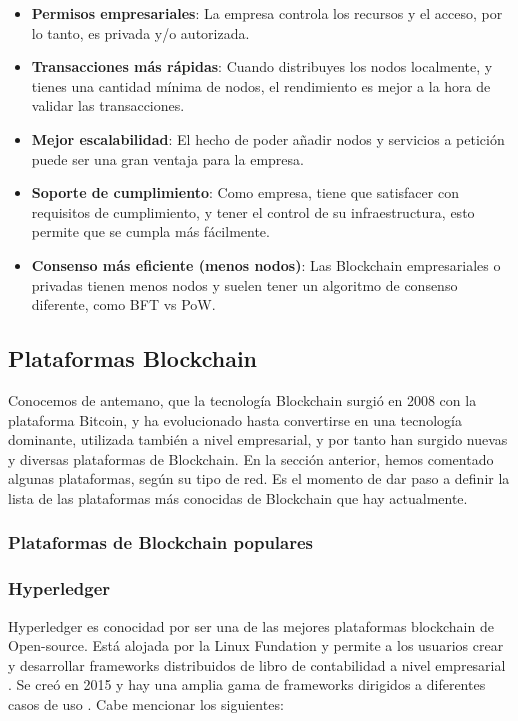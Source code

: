 \begin{itemize}
\item \textbf{Permisos empresariales}: La empresa controla los recursos y el acceso, por lo tanto, es privada y/o 
autorizada.

\item \textbf{Transacciones más rápidas}: Cuando distribuyes los nodos localmente, y tienes una cantidad mínima de 
nodos, el rendimiento es mejor a la hora de validar las transacciones.

\item \textbf{Mejor escalabilidad}: El hecho de poder añadir nodos y servicios a petición puede ser una gran ventaja 
para la empresa.

\item \textbf{Soporte de cumplimiento}: Como empresa, tiene que satisfacer con requisitos de cumplimiento, y tener el 
control de su infraestructura, esto permite que se cumpla más fácilmente.

\item \textbf{Consenso más eficiente (menos nodos)}: Las Blockchain empresariales o privadas tienen menos nodos y 
suelen tener un algoritmo de consenso diferente, como BFT vs PoW.
\end{itemize}

\subsection{Plataformas Blockchain}

Conocemos de antemano, que la tecnología Blockchain surgió en 2008 con la plataforma Bitcoin, y ha evolucionado hasta
convertirse en una tecnología dominante, utilizada también a nivel empresarial, y por tanto han surgido nuevas y 
diversas plataformas de Blockchain. En la sección anterior, hemos comentado algunas plataformas, según su tipo de red.
Es el momento de dar paso a definir la lista de las plataformas más conocidas de Blockchain que hay actualmente.

\subsubsection{Plataformas de Blockchain populares}

\subsubsection*{Hyperledger}

Hyperledger es conocidad por ser una de las mejores plataformas blockchain de Open-source. Está alojada por la Linux 
Fundation y permite a los usuarios crear y desarrollar frameworks distribuidos de libro de contabilidad a nivel 
empresarial \cite{top-blockchain-platforms}. Se creó en 2015 y hay una amplia gama de frameworks dirigidos a diferentes 
casos de uso \cite{top-blockchain-platforms-app}. Cabe mencionar los siguientes: 
    
